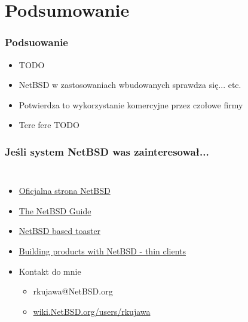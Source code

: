 \documentclass[dvipsnames,table]{beamer}
\begin{document}
\section{Podsumowanie}

\begin{frame}
\frametitle{Podsuowanie}
\begin{itemize}
	\item TODO
	\item NetBSD w zastosowaniach wbudowanych sprawdza się... etc.
	\item Potwierdza to wykorzystanie komercyjne przez czołowe firmy
	\item Tere fere TODO
	\end{itemize}
\end{frame}


\begin{frame}
\frametitle{Jeśli system NetBSD was zainteresował...}
\begin{columns}[c]
\column{3in}

\begin{itemize}
	\item \href{http://www.NetBSD.org/}{Oficjalna strona NetBSD }
	\item \href{http://www.netbsd.org/docs/guide/en/}{The NetBSD Guide}
	\item \href{http://www.embeddedarm.com/software/arm-netbsd-toaster.php}{NetBSD based toaster}
	\item \href{http://misc.allbsd.de/Vortrag/EuroBSDCon_2007/Stephen_Borrill/eurobsdcon.pdf}{Building products with NetBSD - thin clients}
	\item Kontakt do mnie
	\begin{itemize}
		\item rkujawa@NetBSD.org
		\item \href{http://wiki.NetBSD.org/users/rkujawa}{wiki.NetBSD.org/users/rkujawa}
	\end{itemize}
\end{itemize}


\end{columns}
\end{frame}
\end{document}
